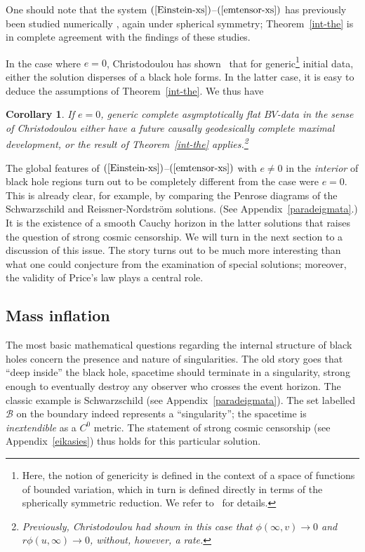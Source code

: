\documentclass{article}
\newtheorem{corollary}{Corollary}[theorem]
\begin{document}
One should note that the
system $(\ref{Einstein-xs})$--$(\ref{emtensor-xs})$ 
has previously been studied
numerically \cite{bo:lte,gpp:de,mc:bhsf}, again under spherical symmetry; 
Theorem~\ref{int-the} is in complete agreement
with the findings of these studies.


In the case where $e=0$,
Christodoulou has shown~\cite{chr:ins} that
for generic\footnote{Here, the notion of genericity is 
defined in the context of a space of functions of bounded variation, 
which in turn is defined directly in terms of the spherically 
symmetric reduction. We refer to~\cite{chr:bv}
for details.} initial data, either the solution disperses
of a black hole forms.
In the latter case, it is easy to deduce the assumptions of
Theorem~\ref{int-the}. We thus have
\begin{corollary}
If $e=0$, generic complete asymptotically flat $BV$-data in the sense of Christodoulou 
either have a future causally geodesically complete maximal development, or
the result of Theorem~\ref{int-the} applies.\footnote{Previously, Christodoulou
had shown in this case that $\phi(\infty,v)\to0$ and $r\phi(u,\infty)\to0$, 
without, however, a rate.} 
\end{corollary}

The global features of $(\ref{Einstein-xs})$--$(\ref{emtensor-xs})$ 
with $e\ne0$ in the \emph{interior} of black hole regions turn out
to be completely different from the case were $e=0$. This is already clear,
for example, by comparing the Penrose diagrams of the Schwarzschild
and Reissner-Nordstr\"om solutions. (See Appendix~\ref{paradeigmata}.)
It is the existence
of a smooth Cauchy horizon in the latter solutions
 that raises the question of strong cosmic censorship. 
 We will turn in the next section
to a discussion of this issue. 
The story turns out to be much more interesting 
than what one could conjecture from the examination of special solutions; 
moreover, the validity of Price's law plays a central role.

\subsection{Mass inflation}
\label{mapl}
The most basic mathematical questions regarding the internal structure
of black holes concern the presence and nature of singularities.
The old story goes that ``deep inside'' the black hole, spacetime
should terminate in a singularity, strong enough to eventually destroy
any observer who crosses the event horizon. The classic example is
Schwarzschild (see Appendix~\ref{paradeigmata}). 
The set labelled $\mathcal{B}$ on the boundary
indeed represents a ``singularity''; the
spacetime is \emph{inextendible} as a $C^0$ metric. 
The statement of strong cosmic censorship (see Appendix~\ref{eikasies}) 
thus holds for this particular solution.
\end{document}
